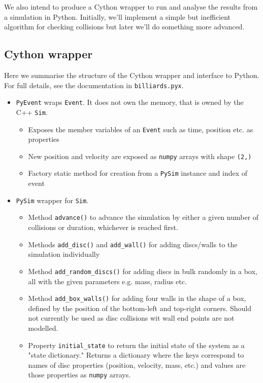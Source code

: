 \documentclass{article}
\begin{document}
We also intend to produce a Cython wrapper to run and analyse the results from a simulation in Python. Initially, we'll implement a simple but inefficient algorithm for checking collisions but later we'll do something more advanced.

\subsection{Cython wrapper}
Here we summarise the structure of the Cython wrapper and interface to Python. For full details, see the documentation in \texttt{billiards.pyx}.
\begin{itemize}
    \item \texttt{PyEvent} wraps \texttt{Event}. It does not own the memory, that is owned by the C++ \texttt{Sim}.
    \begin{itemize}
        \item Exposes the member variables of an \texttt{Event} such as time, position etc. as properties
        \item New position and velocity are exposed as \texttt{numpy} arrays with shape \texttt{(2,)}
        \item Factory static method for creation from a \texttt{PySim} instance and index of event
    \end{itemize}
    \item \texttt{PySim} wrapper for \texttt{Sim}.
    \begin{itemize}
        \item Method \texttt{advance()} to advance the simulation by either a given number of collisions or duration, whichever is reached first.
        \item Methods \texttt{add\_disc()} and \texttt{add\_wall()} for adding discs/walls to the simulation individually
        \item Method \texttt{add\_random\_discs()} for adding discs in bulk randomly in a box, all with the given parameters e.g. mass, radius etc.
        \item Method \texttt{add\_box\_walls()} for adding four walls in the shape of a box, defined by the position of the bottom-left and top-right corners. Should not currently be used as disc collisions wit wall end points are not modelled.
        \item Property \texttt{initial\_state} to return the initial state of the system as a "state dictionary." Returns a dictionary where the keys correspond to names of disc properties (position, velocity, mass, etc.) and values are those properties as \texttt{numpy} arrays.

\end{itemize}
\end{itemize}
\end{document}
